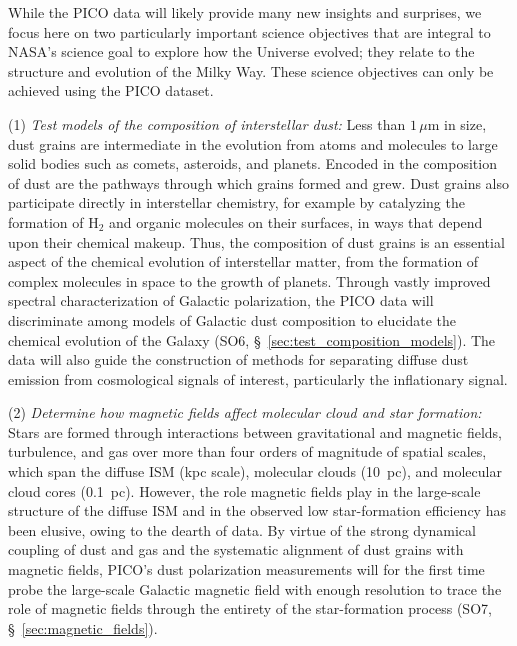 \documentclass[PICOReport.tex]{subfiles}
\begin{document}
While the PICO data will likely provide many new insights and surprises, we focus here on two particularly important science objectives that are integral to NASA's science goal to explore how the Universe evolved; they relate to the structure and evolution of the Milky Way. These science objectives can only be achieved using the PICO dataset.

(1) {\em Test models of the composition of interstellar dust:} 
Less than $1\,\mu$m in size, dust grains are intermediate in the evolution from atoms and molecules to large solid bodies such as comets, asteroids, and planets. Encoded in the composition of dust are the pathways through which grains formed and grew. Dust grains also participate directly in interstellar chemistry, for example by catalyzing the formation of H$_2$ and organic molecules on their surfaces, in ways that depend upon their chemical makeup. Thus, the composition of dust grains is an essential aspect of the chemical evolution of interstellar matter, from the formation of complex molecules in space to the growth of planets. Through vastly improved spectral characterization of Galactic polarization, the PICO data will discriminate among models of Galactic dust composition to elucidate the chemical evolution of the Galaxy (SO6, \S~\ref{sec:test_composition_models}). The data will also guide the construction of methods for separating diffuse dust emission from cosmological signals of interest, particularly the inflationary signal. 

(2) {\em Determine how magnetic fields affect molecular cloud and star formation:}
Stars are formed through interactions between gravitational and magnetic fields, turbulence, and gas over more than four orders of magnitude of spatial scales, which span the diffuse ISM (kpc scale), molecular clouds (10~pc), and molecular cloud cores (0.1~pc). However, the role magnetic fields play in the large-scale structure of the diffuse \ac{ISM} and in the observed low star-formation efficiency has been elusive, owing to the dearth of data. By virtue of the strong dynamical coupling of dust and gas and the systematic alignment of dust grains with magnetic fields, PICO's dust polarization measurements will for the first time probe the large-scale Galactic magnetic field with enough resolution to trace the role of magnetic fields through the entirety of the star-formation process (SO7, \S~\ref{sec:magnetic_fields}). 
\end{document}
